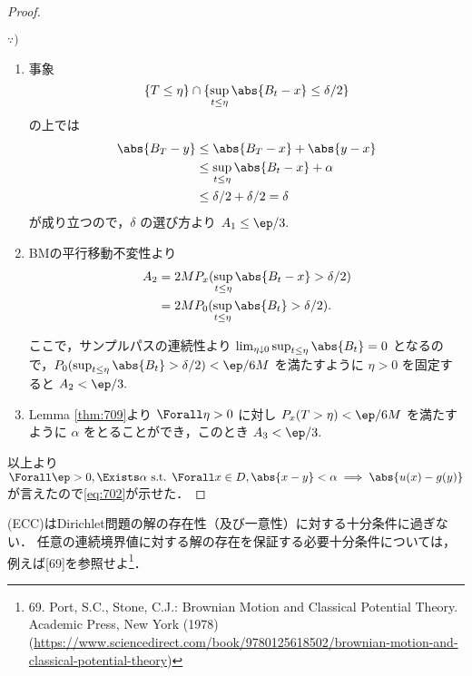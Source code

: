 \documentclass{jsarticle}
\begin{document}
\begin{proof}
    \begin{screen}
        $\because)$
        \begin{enumerate}[label=(\roman*)]
            \item 
            事象
            $$
            \{T\le\eta\}\cap\{\sup_{t\le\eta}\abs{B_t-x}\le\delta/2\}
            $$
            の上では
            \begin{align}
                \abs{B_T-y}
                &\le \abs{B_T-x}+\abs{y-x} \\
                &\le \sup_{t\le\eta}\abs{B_t-x}+\alpha \\
                &\le \delta/2+\delta/2
                =\delta
            \end{align}
            が成り立つので，$\delta$ の選び方より $A_1\le\ep/3.$
            \item
            BMの平行移動不変性より
            \begin{align}
                A_2
                &= 2MP_x(\sup_{t\le\eta}\abs{B_t-x}>\delta/2) \\
                &= 2MP_0(\sup_{t\le\eta}\abs{B_t}>\delta/2).
            \end{align}

            ここで，サンプルパスの連続性より $\lim_{\eta\downarrow0}\sup_{t\le\eta}\abs{B_t}=0$ となるので，$P_0(\sup_{t\le\eta}\abs{B_t}>\delta/2)<\ep/6M$ を満たすように $\eta>0$ を固定すると $A_2<\ep/3.$
            \item
            Lemma \ref{thm:709}より $\Forall \eta>0$ に対し $P_x(T>\eta)<\ep/6M$ を満たすように $\alpha$ をとることができ，このとき $A_3<\ep/3.$
        \end{enumerate}
    \end{screen}

    以上より $\Forall \ep>0, \Exists \alpha\text{ s.t. }\Forall x\in D,\abs{x-y}<\alpha\implies \abs{u(x)-g(y)}$ が言えたので\eqref{eq:702}が示せた．
\end{proof}


\begin{remark*}
    (ECC)はDirichlet問題の解の存在性（及び一意性）に対する十分条件に過ぎない．
    任意の連続境界値に対する解の存在を保証する必要十分条件については，例えば[69]を参照せよ\footnote{69. Port, S.C., Stone, C.J.: Brownian Motion and Classical Potential Theory. Academic Press, New York (1978) (\url{https://www.sciencedirect.com/book/9780125618502/brownian-motion-and-classical-potential-theory})}．
\end{remark*}
\end{document}
